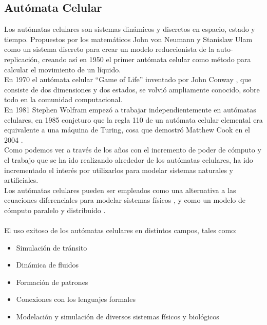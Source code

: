 \subsection{Autómata Celular}


Los autómatas celulares son sistemas dinámicos y discretos en espacio, estado y tiempo. Propuestos por los matemáticos John von Neumann y Stanislaw Ulam como un sistema discreto para crear un modelo reduccionista de la auto-replicación, creando así en 1950 el primer autómata celular como método para calcular el movimiento de un líquido. 
\\
En 1970 el autómata celular “Game of Life” inventado por John Conway \citep{gardner1970mathematical}, que consiste de dos dimensiones y dos estados, se volvió ampliamente conocido, sobre todo en la comunidad computacional.
\\
En 1981 Stephen Wolfram empezó a trabajar independientemente en autómatas celulares, en 1985 conjeturo que la regla 110 de un autómata celular elemental era equivalente a una máquina de Turing, cosa que demostró Matthew Cook en el 2004 \citep{cook2004universality}.
\\
Como podemos ver a través de los años con el incremento de poder de cómputo y el trabajo que se ha ido realizando alrededor de los autómatas celulares, ha ido incrementado el interés por utilizarlos para modelar sistemas naturales y artificiales.
\\
Los autómatas celulares pueden ser empleados como una alternativa a las ecuaciones diferenciales para modelar sistemas físicos \citep{toffoli1984cellular}, y como un modelo de cómputo paralelo y distribuido \citep{hillis1984connection}.
\\
\\
El uso exitoso de los autómatas celulares en distintos campos, tales como:

\begin{itemize}
	\item Simulación de tránsito \citep{simon1998simplified}
	\item Dinámica de fluidos  \citep{margolus1986cellular}
	\item Formación de patrones \citep{tamayo1987cellular,boerlijstk}
	\item Conexiones con los lenguajes formales \citep{nordahl1989formal,culik1990computation}
	\item Modelación y simulación de diversos sistemas físicos \citep{vichniac1984simulating,manneville2012cellular} y biológicos \citep{ermentrout1993cellular}
\end{itemize}

